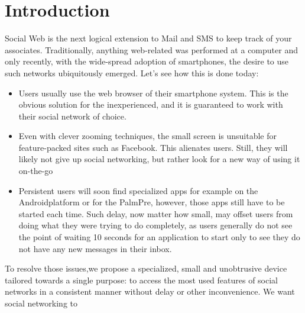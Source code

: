 %
%
%
\section{Introduction}
Social Web is the next logical extension to Mail and SMS to keep track of your associates. Traditionally, 
anything web-related was performed at a computer and only recently, with the wide-spread adoption of 
smartphones, the desire to use such networks ubiquitously emerged. Let's see how this is done today:
\begin{itemize}
  \item %
    Users usually 
    use the web browser of their smartphone system. This is the obvious solution for the inexperienced,
    and it is guaranteed to work with their social network of choice.
  \item Even with clever zooming techniques, the small screen is unsuitable for feature-packed sites such as Facebook\registered. 
    This alienates users. Still, they will likely not give up social networking, but rather look for a new 
    way of using it on-the-go
  \item Persistent users will soon find specialized apps for example on the Android\trademark platform or for the 
    Palm\registered Pre, however, 
    those apps still have to be started each time. Such delay, now matter how small, may offset users from doing what they were 
    trying to do completely, as users generally do not see the point of waiting 10 seconds for an application to start 
    only to see they do not have any new messages in their inbox.
\end{itemize}
To resolve those issues,we propose a specialized, small and unobtrusive device tailored towards a single purpose: to access the 
most used features of social networks in a consistent manner without delay or other inconvenience. We want social networking to
